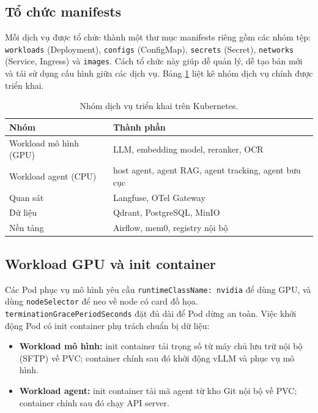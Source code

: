 \subsection{Tổ chức manifests}

Mỗi dịch vụ được tổ chức thành một thư mục manifests riêng gồm các nhóm tệp: \texttt{workloads}
(Deployment), \texttt{configs} (ConfigMap), \texttt{secrets} (Secret), \texttt{networks}
(Service, Ingress) và \texttt{images}. Cách tổ chức này giúp dễ quản lý, dễ tạo bản mới và
tái sử dụng cấu hình giữa các dịch vụ. Bảng \ref{tab:k8s-services} liệt kê nhóm dịch vụ
chính được triển khai.

\begin{table}[htbp]
\centering
\caption{Nhóm dịch vụ triển khai trên Kubernetes.}
\label{tab:k8s-services}
\small
\begin{tabular}{@{}p{5.4cm}p{9cm}@{}}
\toprule
\textbf{Nhóm} & \textbf{Thành phần} \\
\midrule
Workload mô hình (GPU) & LLM, embedding model, reranker, OCR \\
Workload agent (CPU) & host agent, agent RAG, agent tracking, agent bưu cục \\
Quan sát & Langfuse, OTel Gateway \\
Dữ liệu & Qdrant, PostgreSQL, MinIO \\
Nền tảng & Airflow, mem0, registry nội bộ \\
\bottomrule
\end{tabular}
\end{table}

\subsection{Workload GPU và init container}

Các Pod phục vụ mô hình yêu cầu \texttt{runtimeClassName: nvidia} để dùng GPU, và dùng
\texttt{nodeSelector} để neo về node có card đồ họa. \texttt{terminationGracePeriodSeconds}
đặt đủ dài để Pod dừng an toàn. Việc khởi động Pod có init container phụ trách chuẩn bị
dữ liệu:

\begin{itemize}
  \item \textbf{Workload mô hình:} init container tải trọng số từ máy chủ lưu trữ nội bộ
  (SFTP) về PVC; container chính sau đó khởi động vLLM và phục vụ mô hình.
  \item \textbf{Workload agent:} init container tải mã agent từ kho Git nội bộ về PVC;
  container chính sau đó chạy API server.
\end{itemize}

